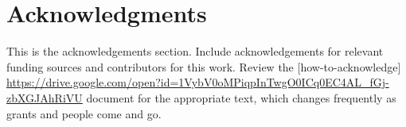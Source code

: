 \section{Acknowledgments}
This is the acknowledgements section.
Include acknowledgements for relevant funding sources and contributors for
this work. Review the [how-to-acknowledge] \url{https://drive.google.com/open?id=1VybV0oMPiqpInTwgO0ICq0EC4AL_fGj-zbXGJAhRiVU}
document for the appropriate text, which changes frequently as grants and people
come and go.
